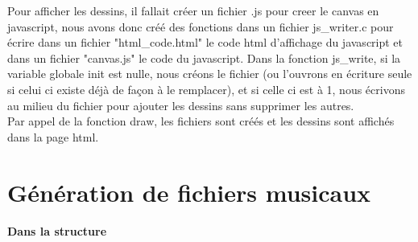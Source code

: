 \documentclass{report}
\begin{document}
Pour afficher les dessins, il fallait créer un fichier .js pour creer le canvas en javascript, nous avons donc créé des fonctions dans un fichier js_writer.c pour écrire dans un fichier "html_code.html" le code html d'affichage du javascript et dans un fichier "canvas.js" le code du javascript. Dans la fonction js_write, si la variable globale init est nulle, nous créons le fichier (ou l'ouvrons en écriture seule si celui ci existe déjà de façon à le remplacer), et si celle ci est à 1, nous écrivons au milieu du fichier pour ajouter les dessins sans supprimer les autres.\\
Par appel de la fonction draw, les fichiers sont créés et les dessins sont affichés dans la page html.

\part{Génération de fichiers musicaux}
\subsection{Dans la structure}
\end{document}
